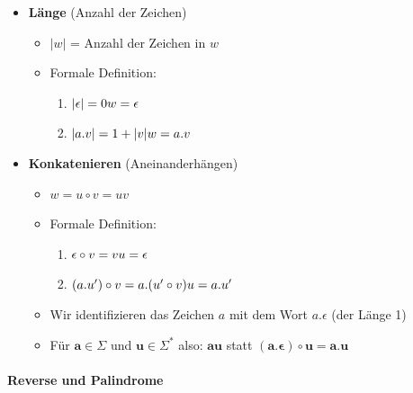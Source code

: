 \documentclass{scrartcl}
\begin{document}
\begin{itemize}
	\item \textbf{Länge} (Anzahl der Zeichen)
	\begin{itemize}
		\item $|w|$ = Anzahl der Zeichen in $w$
		\item Formale Definition:
		\begin{enumerate}
			\item $|\epsilon| = 0 \hfill w = \epsilon$
			\item $|a.v| = 1 + |v| \hfill w = a.v$
		\end{enumerate}
	\end{itemize}
	\item \textbf{Konkatenieren} (Aneinanderhängen)
	\begin{itemize}
		\item $w = u \circ v = uv$
		\item Formale Definition:
		\begin{enumerate}
			\item $\epsilon \circ v = v \hfill u = \epsilon$
			\item $(a.u') \circ v = a.(u' \circ v) \hfill u = a.u'$
		\end{enumerate}
		 \item Wir identifizieren das Zeichen $a$ mit dem Wort $a.\epsilon$ (der Länge 1)
		 \item Für $\mathbf{a} \in \Sigma$ und $\mathbf{u} \in \Sigma^*$ also: $\mathbf{au}$ statt $\mathbf{(a.\epsilon) \circ u = a.u}$
	\end{itemize}
\end{itemize}

\paragraph{Reverse und Palindrome}
\end{document}
